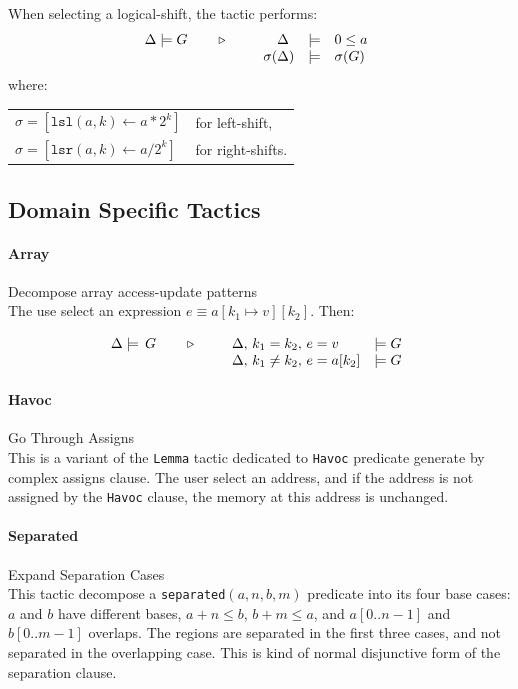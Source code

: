 When selecting a logical-shift, the tactic performs:
\[\TACTIC{\Delta\models G}{%
\begin{array}[t]{rcl}
\Delta\phantom{)} &\models& 0 \leq a \\
\sigma(\Delta) &\models& \sigma(G)
\end{array}
}\]
where:
\begin{tabular}[t]{ll}
$\sigma = [ \mathtt{lsl}(a,k) \leftarrow a * 2^k ]$ &
for left-shift, \\
$\sigma = [ \mathtt{lsr}(a,k) \leftarrow a / 2^k ]$ &
for right-shifts.
\end{tabular}

\subsection{Domain Specific Tactics}

\paragraph{Array} Decompose array access-update patterns\\
The use select an expression $e\equiv a[k_1\mapsto v][k_2]$. Then:

\[
\TACTIC{\Delta\models\,G}{%
\begin{array}[t]{ll}
\Delta,\,k_1=k_2,\,e = v &\models G \\
\Delta,\,k_1\neq k_2,\,e = a[k_2] &\models G
\end{array}
}\]

\paragraph{Havoc} Go Through Assigns \\
This is a variant of the \texttt{Lemma} tactic dedicated to \texttt{Havoc} predicate generate by complex assigns clause. The user select an address, and if the address is not assigned by the \texttt{Havoc} clause, the memory at this address is unchanged.

\paragraph{Separated} Expand Separation Cases\\
This tactic decompose a \texttt{separated}$(a,n,b,m)$ predicate into its four base cases: $a$ and $b$ have different bases, $a+n \leq b$, $b+m \leq a$, and $a[0..n-1]$ and $b[0..m-1]$ overlaps. The regions are separated in the first three cases, and not separated in the overlapping case. This is kind of normal disjunctive form of the separation clause.


